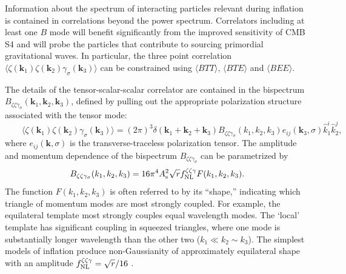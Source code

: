 Information about the spectrum of interacting particles relevant during inflation is contained in correlations beyond the power spectrum. Correlators including at least one $B$ mode will benefit significantly from the improved sensitivity of CMB S4 and will probe the particles that contribute to sourcing primordial gravitational waves. In particular, the three point correlation $\langle \zeta(\mathbf{k}_1)\zeta(\mathbf{k}_2)\gamma_\sigma(\mathbf{k}_3) \rangle$ can be constrained using $\langle BTT\rangle$, $\langle BTE\rangle $ and $\langle BEE\rangle$.

The details of the tensor-scalar-scalar correlator are contained in the bispectrum $B_{\zeta\zeta\gamma_\sigma}(\mathbf{k}_1,\mathbf{k}_2,\mathbf{k}_3)$, defined by pulling out the appropriate polarization structure associated with the tensor mode:
\begin{equation}
\label{eq:Bsst}
\qquad \langle \zeta(\mathbf{k}_1)\zeta(\mathbf{k}_2)\gamma_\sigma(\mathbf{k}_3) \rangle = (2\pi)^3 \delta(\mathbf{k}_1+\mathbf{k}_2+\mathbf{k}_3) B_{\zeta\zeta\gamma_\sigma}(k_1,k_2,k_3) e_{ij}(\mathbf{k}_3,\sigma)\hat{k}_1^i \hat{k}_2^j,
\end{equation}
where $e_{ij}(\mathbf{k},\sigma)$ is the transverse-traceless polarization tensor.  
The amplitude and momentum dependence of the bispectrum $B_{\zeta\zeta\gamma_\sigma}$ can be parametrized by \cite{Meerburg:2016ecv}
\begin{equation}
\label{eq:Bzzg}
B_{\zeta\zeta\gamma_\sigma}(k_1,k_2,k_3)= 16 \pi^4 A_{\rm s}^2 \sqrt{r}f_\mathrm{NL}^{\zeta\zeta\gamma} F(k_1,k_2,k_3).
\end{equation} 
The function $F(k_1,k_2,k_3)$ is often referred to by its ``shape,'' indicating which triangle of momentum modes are most strongly coupled.  For example, the equilateral template most strongly couples equal wavelength modes. The `local' template has significant coupling in squeezed triangles, where one mode is substantially longer wavelength than the other two ($k_1\ll k_2\sim k_3$). The simplest models of inflation produce non-Gaussianity of approximately equilateral shape with an amplitude $f^{\zeta \zeta\gamma }_{\rm NL} = \sqrt{r}/16$ \cite{Maldacena:2002vr,Maldacena:2011nz}. 

